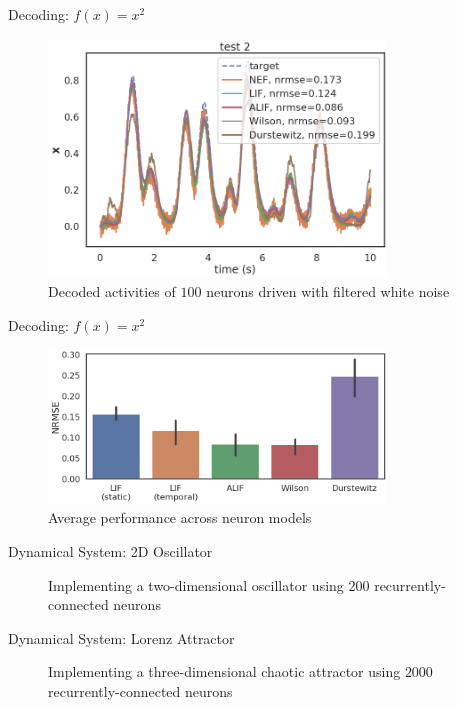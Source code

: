 \documentclass[aspectratio=169]{beamer}
\begin{document}
\begin{frame}{Decoding: $f(x) = x^2$}
\begin{figure}
    \centering
    \includegraphics[width=0.8\textwidth]{media/function_test2_order2.png}
    \caption{Decoded activities of $100$ neurons driven with filtered white noise}
\end{figure}
\end{frame}
\begin{frame}{Decoding: $f(x) = x^2$}
\begin{figure}
    \centering
    \includegraphics[width=0.8\textwidth]{media/function_barplots_order2.png}
    \caption{Average performance across neuron models}
\end{figure}
\end{frame}

\begin{frame}{Dynamical System: 2D Oscillator}
\begin{figure}
    \centering
    \caption{Implementing a two-dimensional oscillator using $200$ recurrently-connected neurons}
\end{figure}
\end{frame}

\begin{frame}{Dynamical System: Lorenz Attractor}
\begin{figure}
    \centering
    \caption{Implementing a three-dimensional chaotic attractor using $2000$ recurrently-connected neurons}
\end{figure}
\end{frame}
\end{document}
